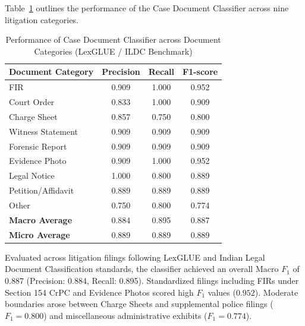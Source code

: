 \documentclass[3p,times,procedia]{elsarticle}
\begin{document}
Table~\ref{tab:doc_classification} outlines the performance of the Case Document Classifier across nine litigation categories.

\begin{table}[htbp]
\centering
\caption{Performance of Case Document Classifier across Document Categories (LexGLUE / ILDC Benchmark)}
\label{tab:doc_classification}
\begin{tabular}{lccc}
\hline
\textbf{Document Category} & \textbf{Precision} & \textbf{Recall} & \textbf{F1-score} \\ \hline
FIR                       & 0.909 & 1.000 & 0.952 \\
Court Order               & 0.833 & 1.000 & 0.909 \\
Charge Sheet              & 0.857 & 0.750 & 0.800 \\
Witness Statement         & 0.909 & 0.909 & 0.909 \\
Forensic Report           & 0.909 & 0.909 & 0.909 \\
Evidence Photo            & 0.909 & 1.000 & 0.952 \\
Legal Notice              & 1.000 & 0.800 & 0.889 \\
Petition/Affidavit        & 0.889 & 0.889 & 0.889 \\
Other                     & 0.750 & 0.800 & 0.774 \\ \hline
\textbf{Macro Average}     & 0.884 & 0.895 & 0.887 \\
\textbf{Micro Average}     & 0.889 & 0.889 & 0.889 \\ \hline
\end{tabular}
\end{table}

Evaluated across litigation filings following LexGLUE and Indian Legal Document Classification standards, the classifier achieved an overall Macro $F_1$ of 0.887 (Precision: 0.884, Recall: 0.895). Standardized filings including FIRs under Section 154 CrPC and Evidence Photos scored high $F_1$ values ($0.952$). Moderate boundaries arose between Charge Sheets and supplemental police filings ($F_1 = 0.800$) and miscellaneous administrative exhibits ($F_1 = 0.774$).
\end{document}
